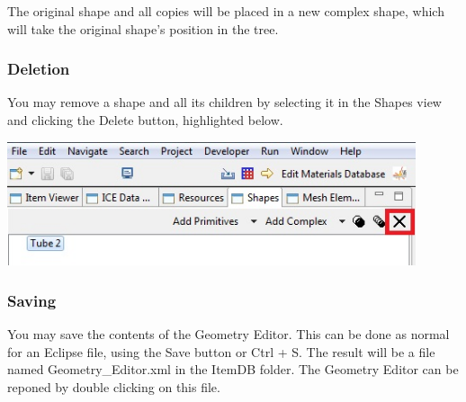The original shape and all copies will be placed in a new complex shape, which
will take the original shape's position in the tree.

\subsubsection{Deletion}

You may remove a shape and all its children by selecting it in the Shapes view
and clicking the Delete button, highlighted below.

\begin{center}
\includegraphics[width=12cm]{images/GeometryDeleteButton.jpg}
\end{center}

\subsubsection{Saving}

You may save the contents of the Geometry Editor. This can be done as normal for
an Eclipse file, using the Save button or Ctrl + S. The result will be a file
named Geometry\_Editor.xml in the ItemDB folder. The Geometry Editor can be
reponed by double clicking on this file. 
